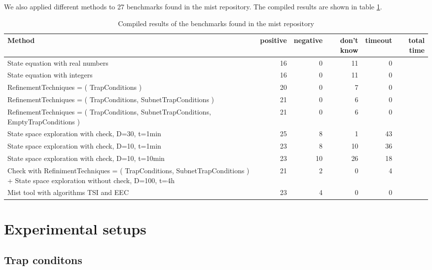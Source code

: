 \documentclass{article}
\begin{document}
We also applied different methods to 27 benchmarks found in the mist repository.
The compiled results are shown in table \ref{table-results-compiled-mist}.
\begin{table}[h]
\begin{center}
  \begin{tabular}{ | p{5cm} | r | r | r | r | r | }
    \hline
    Method & positive & negative & don't know & timeout & total time \\
    \hline
    State equation with real numbers & 16 &  0 & 11 &  0 & \\
    State equation with integers     & 16 &  0 & 11 &  0 & \\
    \hline
    RefinementTechniques = ( TrapConditions ) &
    20 &  0 &  7 &  0 & \\
    RefinementTechniques = ( TrapConditions, SubnetTrapConditions ) &
    21 &  0 &  6 &  0 & \\
    RefinementTechniques = ( TrapConditions, SubnetTrapConditions, EmptyTrapConditions ) &
    21 &  0 &  6 &  0 & \\
    \hline
    State space exploration with check, D=30, t=1min  & 25 &  8 &  1 &  43 & \\
    State space exploration with check, D=10, t=1min  & 23 &  8 & 10 &  36 & \\
    State space exploration with check, D=10, t=10min & 23 & 10 & 26 &  18 & \\
    \hline
    Check with RefinimentTechniques = ( TrapConditions, SubnetTrapConditions ) +
    State space exploration without check, D=100, t=4h
    & 21 &  2 & 0 &  4 & \\
    \hline
    Mist tool with algorithms TSI and EEC & 23 &  4 & 0 &  0 & \\
    \hline
  \end{tabular}
\end{center}
\caption{Compiled results of the benchmarks found in the mist repository}
\label{table-results-compiled-mist}
\end{table}

\section{Experimental setups}

\subsection{Trap conditons}
\end{document}
